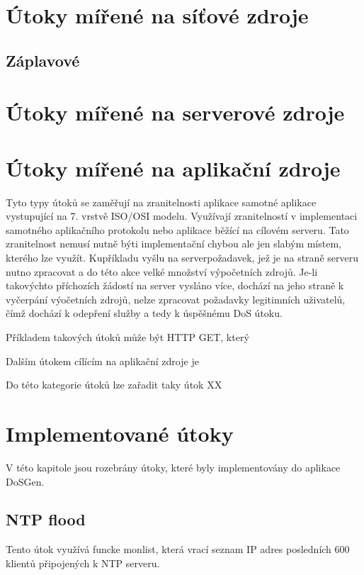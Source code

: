 \section{Útoky mířené na síťové zdroje}

\subsection{Záplavové}

\section{Útoky mířené na serverové zdroje}

\section{Útoky mířené na aplikační zdroje}
Tyto typy útoků se zaměřují na zranitelnosti aplikace samotné aplikace vystupující na 7. vrstvě ISO/OSI modelu. Využívají zranitelností v implementaci samotného aplikačního protokolu nebo aplikace běžící na cílovém serveru. Tato zranitelnost nemusí nutně býti implementační chybou ale jen slabým místem, kterého lze využít. Kupříkladu vyšlu na serverpožadavek, jež je na straně serveru nutno zpracovat a do této akce velké množství výpočetních zdrojů. Je-li takovýchto příchozích žádostí na server vysláno více, dochází na jeho straně k vyčerpání výočetních zdrojů, nelze zpracovat požadavky legitimních uživatelů, čímž dochází k odepření služby a tedy k úspěšnému DoS útoku.


Příkladem takových útoků může být HTTP GET, který

Dalším útokem cílícím na aplikační zdroje je

Do této kategorie útoků lze zařadit taky útok XX

\section{Implementované útoky}
V této kapitole jsou rozebrány útoky, které byly implementovány do aplikace DoSGen.

\subsection{NTP flood}
Tento útok využívá funcke monlist, která vrací seznam IP adres posledních 600 klientů připojených k NTP serveru.


